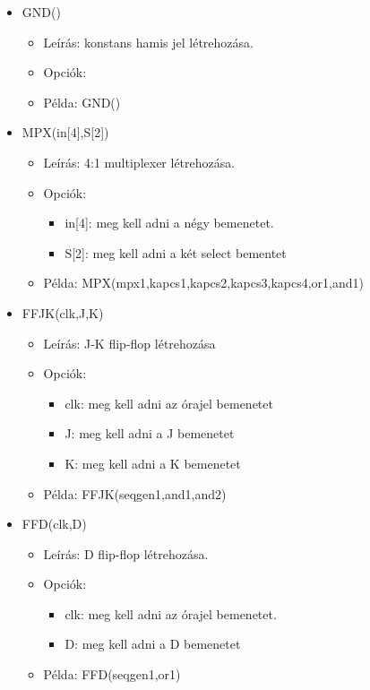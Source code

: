 \begin{itemize}
\item GND()
	\begin{itemize}
	\item Leírás: konstans hamis jel létrehozása.
	\item Opciók: 
	\item Példa: GND()
	\end{itemize}	

\item MPX(in[4],S[2])
	\begin{itemize}
	\item Leírás: 4:1 multiplexer létrehozása.
	\item Opciók: 
		\begin{itemize}
			\item in[4]: meg kell adni a négy bemenetet.
			\item S[2]: meg kell adni a két select bementet
		\end{itemize}
	\item Példa: MPX(mpx1,kapcs1,kapcs2,kapcs3,kapcs4,or1,and1)
	\end{itemize}	
	
\item FFJK(clk,J,K)
	\begin{itemize}
	\item Leírás: J-K flip-flop létrehozása
	\item Opciók: 
		\begin{itemize}
			\item clk: meg kell adni az órajel bemenetet
			\item J: meg kell adni a J bemenetet
			\item K: meg kell adni a K bemenetet
		\end{itemize}
	\item Példa: FFJK(seqgen1,and1,and2)
	\end{itemize}

\item FFD(clk,D)
	\begin{itemize}
	\item Leírás: D flip-flop létrehozása.
	\item Opciók: 
		\begin{itemize}
			\item clk: meg kell adni az órajel bemenetet.
			\item D: meg kell adni a D bemenetet
		\end{itemize}
	\item Példa: FFD(seqgen1,or1)
	\end{itemize}
	

\end{itemize}
